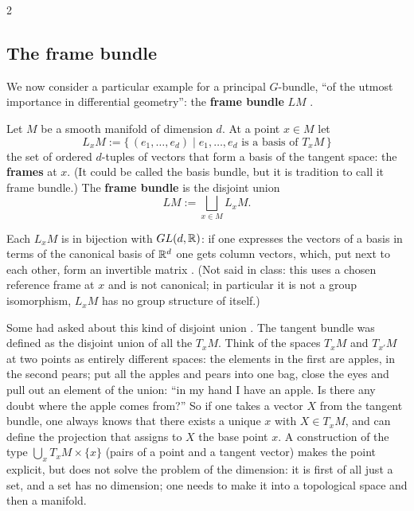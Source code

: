 \begin{paracol}{2}
\subsection{The frame bundle}\label{sec:pb-frame}
We now consider a particular example for a principal $G$-bundle, ``of the utmost importance in differential geometry'': the \textbf{frame bundle} $LM$  .
\begin{definition}\label{def:pb-frame}
Let $M$ be a smooth manifold of dimension $d$. At a point $x\in M$ let
\[
  L_xM:=\{\,(e_1,\dots,e_d)\mid e_1,\dots,e_d\text{ is a basis of }T_xM\,\}
\]
the set of ordered $d$-tuples of vectors that form a basis of the tangent space: the \textbf{frames} at $x$. (It could be called the basis bundle, but it is tradition to call it frame bundle.) The \textbf{frame bundle} is the disjoint union
\[
  LM:=\bigsqcup_{x\in M}L_xM .
\]
   
\end{definition}
Each $L_xM$ is in bijection with $GL(d,\mathbb{R})$: if one expresses the vectors of a basis in terms of the canonical basis of $\mathbb{R}^d$ one gets column vectors, which, put next to each other, form an invertible matrix  . (Not said in class: this uses a chosen reference frame at $x$ and is not canonical; in particular it is not a group isomorphism, $L_xM$ has no group structure of itself.)
\begin{aside}
Some had asked about this kind of disjoint union . The tangent bundle was defined as the disjoint union of all the $T_xM$. Think of the spaces $T_xM$ and $T_{x'}M$ at two points as entirely different spaces: the elements in the first are apples, in the second pears; put all the apples and pears into one bag, close the eyes and pull out an element of the union: ``in my hand I have an apple. Is there any doubt where the apple comes from?'' So if one takes a vector $X$ from the tangent bundle, one always knows that there exists a unique $x$ with $X\in T_xM$, and can define the projection that assigns to $X$ the base point $x$. A construction of the type $\bigcup_xT_xM\times\{x\}$ (pairs of a point and a tangent vector) makes the point explicit, but does not solve the problem of the dimension: it is first of all just a set, and a set has no dimension; one needs to make it into a topological space and then a manifold.         

\end{aside}
\end{paracol}
